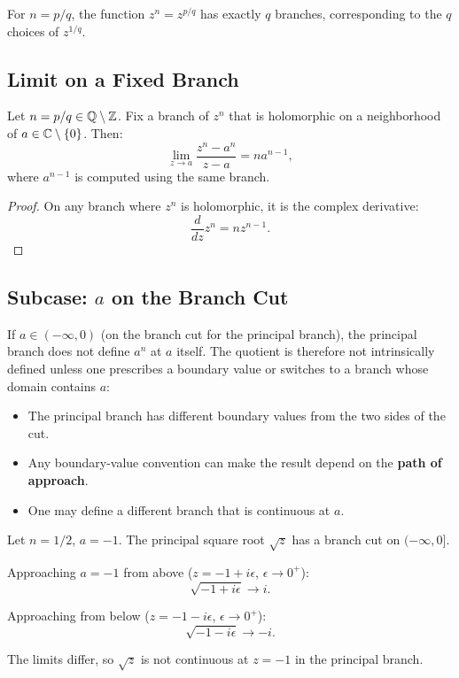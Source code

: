 \begin{proposition}
For $n = p/q$, the function $z^n = z^{p/q}$ has exactly $q$ branches, corresponding to the $q$ choices of $z^{1/q}$.
\end{proposition}

\subsection{Limit on a Fixed Branch}

\begin{theorem}
Let $n = p/q \in \mathbb{Q} \setminus \mathbb{Z}$. Fix a branch of $z^n$ that is holomorphic on a neighborhood of $a \in \mathbb{C} \setminus \{0\}$. Then:
\begin{equation}
\lim_{z \to a} \frac{z^n - a^n}{z - a} = n a^{n-1},
\end{equation}
where $a^{n-1}$ is computed using the same branch.
\end{theorem}

\begin{proof}
On any branch where $z^n$ is holomorphic, it is the complex derivative:
\begin{equation}
\frac{d}{dz} z^n = n z^{n-1}.
\end{equation}
\end{proof}

\subsection{Subcase: $a$ on the Branch Cut}

\begin{warning}
If $a \in (-\infty, 0)$ (on the branch cut for the principal branch), the principal branch does not define $a^n$ at $a$ itself. The quotient is therefore not intrinsically defined unless one prescribes a boundary value or switches to a branch whose domain contains $a$:
\begin{itemize}
    \item The principal branch has different boundary values from the two sides of the cut.
    \item Any boundary-value convention can make the result depend on the \textbf{path of approach}.
    \item One may define a different branch that is continuous at $a$.
\end{itemize}
\end{warning}

\begin{example}
Let $n = 1/2$, $a = -1$. The principal square root $\sqrt{z}$ has a branch cut on $(-\infty, 0]$.

Approaching $a = -1$ from above ($z = -1 + i\epsilon$, $\epsilon \to 0^+$):
\[
\sqrt{-1 + i\epsilon} \to i.
\]

Approaching from below ($z = -1 - i\epsilon$, $\epsilon \to 0^+$):
\[
\sqrt{-1 - i\epsilon} \to -i.
\]

The limits differ, so $\sqrt{z}$ is not continuous at $z = -1$ in the principal branch.
\end{example}

